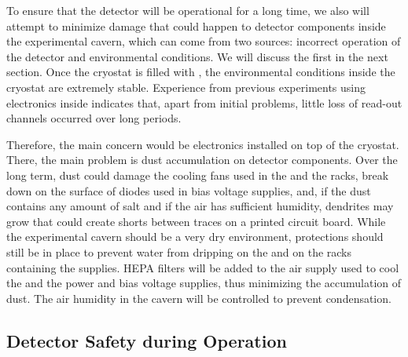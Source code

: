 To ensure that the  detector will be operational for a long
time, we also will attempt to minimize 
damage that could happen to detector components inside the 
experimental cavern, which can come from two sources: incorrect
operation of the detector and environmental conditions. We
will discuss the first in the next section. Once the cryostat is filled with , the environmental
conditions inside the cryostat are extremely stable. Experience from 
previous experiments using electronics inside 
 indicates that, apart from initial problems, little loss of read-out channels occurred over long periods. 

Therefore, the main concern would be electronics 
installed on top of the cryostat. There, the main problem
is dust accumulation on detector components. Over the long
term, dust could damage the cooling fans used
in the  and the  racks, break down 
on the surface of diodes used in bias voltage supplies,
and, if the dust contains any amount of salt and if the air has sufficient humidity, dendrites may grow that could create 
shorts between traces on a printed circuit board. While the
experimental cavern should be a very dry environment,
protections should still be in place to prevent water from 
dripping on the  and on the racks containing the
 supplies. HEPA filters will be added to the
air supply used to cool the  and the  power and bias voltage supplies, thus minimizing
the accumulation of dust. The air humidity in the cavern 
will be controlled to prevent condensation.

\subsection{Detector Safety during Operation}
\label{sec:fdsp-tpcelec-safety-detops}

